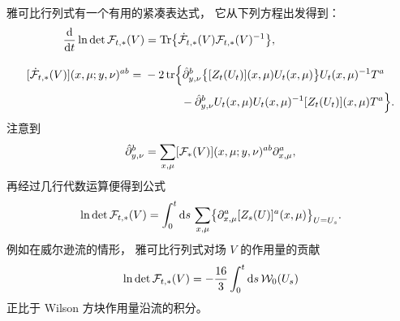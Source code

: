 雅可比行列式有一个有用的紧凑表达式，
它从下列方程出发得到：
\begin{align}
  {\mathrm{d}\over\mathrm{d}t}\ln\det\mathcal{F}_{t,*}(V)
  &=\mathrm{Tr}\bigl\{\dot{\mathcal{F}}_{t,*}(V)\mathcal{F}_{t,*}(V)^{-1}\bigr\},
  \\[2.0ex]
  [\dot{\mathcal{F}}_{t,*}(V)](x,\mu;y,\nu)^{ab}
  ={}&-2\,\mathrm{tr}\Bigl\{\hat{\partial}^b_{y,\nu}\bigl\{[Z_t(U_t)](x,\mu)U_t(x,\mu)\bigr\}
  U_t(x,\mu)^{-1}T^a
  \notag\\[0.5ex]
  &\hspace{3.2em}-\hat{\partial}^b_{y,\nu}U_t(x,\mu)U_t(x,\mu)^{-1}
  [Z_t(U_t)](x,\mu)T^a\Bigr\}.
\end{align}
注意到
\begin{equation}
  \hat{\partial}^b_{y,\nu}=\sum_{x,\mu}[\mathcal{F}_{*}(V)](x,\mu;y,\nu)^{ab}
  \partial^a_{x,\mu},
\end{equation}
再经过几行代数运算便得到公式
\begin{equation}
  \ln\det\mathcal{F}_{t,*}(V)=\int_0^t\mathrm{d} s\,\sum_{x,\mu}
  \bigl\{\partial^a_{x,\mu}[Z_s(U)]^a(x,\mu)\bigr\}_{U=U_s}.
\end{equation}
例如在威尔逊流的情形，
雅可比行列式对场 $V$ 的作用量的贡献
\begin{equation}
  \ln\det\mathcal{F}_{t,*}(V)=-\frac{16}{3}\int_0^t\mathrm{d} s\,\mathcal{W}_0(U_s)
\end{equation}
正比于 Wilson 方块作用量沿流的积分。
